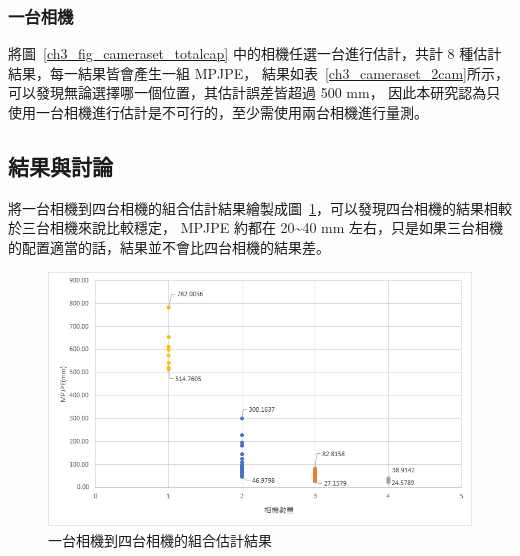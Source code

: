 \subsubsection{一台相機}
將圖~\ref{ch3_fig_cameraset_totalcap} 中的相機任選一台進行估計，共計 8 種估計結果，每一結果皆會產生一組 MPJPE，
結果如表~\ref{ch3_cameraset_2cam}所示，可以發現無論選擇哪一個位置，其估計誤差皆超過 500 mm，
因此本研究認為只使用一台相機進行估計是不可行的，至少需使用兩台相機進行量測。
\begin{table}[!ht]
   \caption[一台相機組合與其估計結果誤差]{一台相機組合與其估計結果誤差}
   \centering
   \label{ch3_cameraset_1cam}
   \setlength{\tabcolsep}{3pt}
   \renewcommand\arraystretch{1.5}
\end{table}

\subsection{結果與討論}
將一台相機到四台相機的組合估計結果繪製成圖~\ref{ch3_fig_1.2.3.4cam}，可以發現四台相機的結果相較於三台相機來說比較穩定，
MPJPE 約都在 20\textasciitilde40 mm 左右，只是如果三台相機的配置適當的話，結果並不會比四台相機的結果差。
\begin{figure}[!ht]
   \centering
   \includegraphics[width=12cm]{figure/ch3_fig_1.2.3.4cam.png}
   \caption[一台相機到四台相機的組合估計結果]{一台相機到四台相機的組合估計結果}
   \label{ch3_fig_1.2.3.4cam}
\end{figure}

